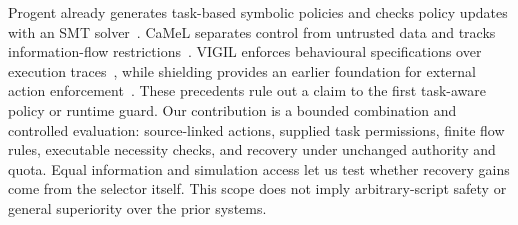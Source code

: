 Progent already generates task-based symbolic policies and checks policy
updates with an SMT solver~\cite{progent}. CaMeL separates control from untrusted
data and tracks information-flow restrictions~\cite{camel}. VIGIL enforces
behavioural specifications over execution traces~\cite{vigil}, while shielding
provides an earlier foundation for external action enforcement~\cite{shield}.
These precedents rule out a claim to the first task-aware policy or runtime
guard. Our contribution is a bounded combination and controlled evaluation:
source-linked actions, supplied task permissions, finite flow rules, executable
necessity checks, and recovery under unchanged authority and quota. Equal
information and simulation access let us test whether recovery gains come from
the selector itself. This scope does not imply arbitrary-script safety or
general superiority over the prior systems.
